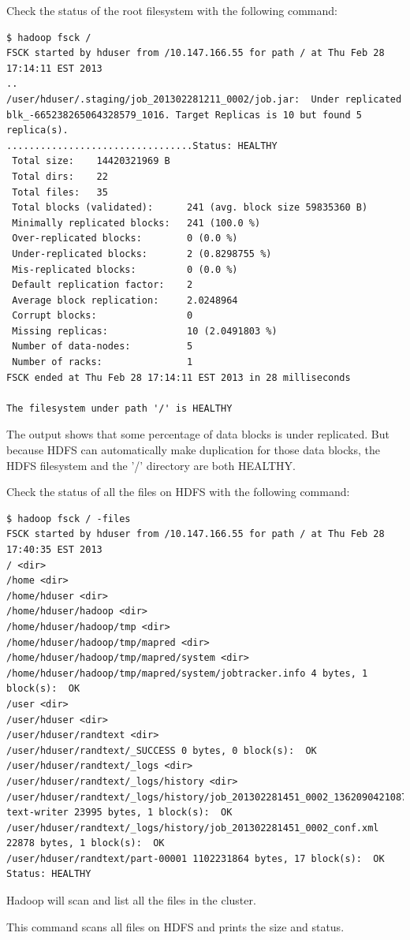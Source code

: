 Check the status of the root filesystem with the following command:
\begin{verbatim}
$ hadoop fsck /
FSCK started by hduser from /10.147.166.55 for path / at Thu Feb 28 17:14:11 EST 2013
..
/user/hduser/.staging/job_201302281211_0002/job.jar:  Under replicated blk_-665238265064328579_1016. Target Replicas is 10 but found 5 replica(s).
.................................Status: HEALTHY
 Total size:    14420321969 B
 Total dirs:    22
 Total files:   35
 Total blocks (validated):      241 (avg. block size 59835360 B)
 Minimally replicated blocks:   241 (100.0 %)
 Over-replicated blocks:        0 (0.0 %)
 Under-replicated blocks:       2 (0.8298755 %)
 Mis-replicated blocks:         0 (0.0 %)
 Default replication factor:    2
 Average block replication:     2.0248964
 Corrupt blocks:                0
 Missing replicas:              10 (2.0491803 %)
 Number of data-nodes:          5
 Number of racks:               1
FSCK ended at Thu Feb 28 17:14:11 EST 2013 in 28 milliseconds

The filesystem under path '/' is HEALTHY
\end{verbatim}

The output shows that some percentage of data blocks is under replicated. But because HDFS can automatically make duplication for those data blocks, the HDFS filesystem and the '/' directory are both HEALTHY.

Check the status of all the files on HDFS with the following command:
\begin{verbatim}
$ hadoop fsck / -files
FSCK started by hduser from /10.147.166.55 for path / at Thu Feb 28 17:40:35 EST 2013
/ <dir>
/home <dir>
/home/hduser <dir>
/home/hduser/hadoop <dir>
/home/hduser/hadoop/tmp <dir>
/home/hduser/hadoop/tmp/mapred <dir>
/home/hduser/hadoop/tmp/mapred/system <dir>
/home/hduser/hadoop/tmp/mapred/system/jobtracker.info 4 bytes, 1 block(s):  OK
/user <dir>
/user/hduser <dir>
/user/hduser/randtext <dir>
/user/hduser/randtext/_SUCCESS 0 bytes, 0 block(s):  OK
/user/hduser/randtext/_logs <dir>
/user/hduser/randtext/_logs/history <dir>
/user/hduser/randtext/_logs/history/job_201302281451_0002_1362090421087_hduser_random-text-writer 23995 bytes, 1 block(s):  OK
/user/hduser/randtext/_logs/history/job_201302281451_0002_conf.xml 22878 bytes, 1 block(s):  OK
/user/hduser/randtext/part-00001 1102231864 bytes, 17 block(s):  OK
Status: HEALTHY
\end{verbatim}
Hadoop will scan and list all the files in the cluster.

This command scans all files on HDFS and prints the size and status.


